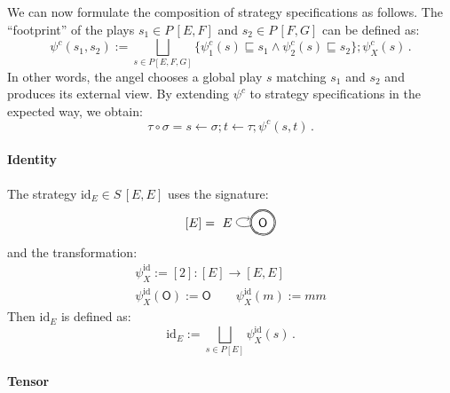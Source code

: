 \documentclass[draft,11pt]{report}
\newcommand{\kw}[1]{\ensuremath{ \mathsf{#1} }}
\begin{document}
We can now formulate the composition of strategy specifications as follows.
The ``footprint'' of the plays $s_1 \in P \, [E,F]$ and $s_2 \in P \, [F,G]$
can be defined as:
\[
  \psi^c(s_1, s_2) :=
    \bigsqcup_{s \in P [E,F,G]}
    \{ \psi^c_1(s) \sqsubseteq s_1 \wedge \psi^c_2(s) \sqsubseteq s_2 \} ;
    \psi^c_X(s) \,.
\]
In other words,
the angel chooses a global play $s$
matching $s_1$ and $s_2$
and produces its external view.
By extending $\psi^c$ to strategy specifications
in the expected way, we obtain:
\[
  \tau \circ \sigma = 
    s \leftarrow \sigma ;
    t \leftarrow \tau ;
    \psi^c(s, t) \,.
\]


\paragraph{Identity} %

The strategy $\mathrm{id}_E \in S \, [E,E]$
uses the signature:
\[
  [E] =
  \begin{tikzpicture}[baseline=(O.base)]
    \node[circle,draw,double] (O) at (0,0) {$\kw{O}$};
    \path[->] (O) edge[loop left] node[auto] {$E$} (O);
  \end{tikzpicture}
\]
and the transformation:
\begin{gather*}
  \psi^\mathrm{id}_X := [2] : [E] \rightarrow [E,E] \\
  \psi^\mathrm{id}_X(\kw{O}) := \kw{O} \qquad
  \psi^\mathrm{id}_X(m) := mm
\end{gather*}
Then $\mathrm{id}_E$ is defined as:
\[
  \mathrm{id}_E :=
    \bigsqcup_{s \in P [E]} \psi^\mathrm{id}_X(s) \,.
\]


\paragraph{Tensor} %
\end{document}
